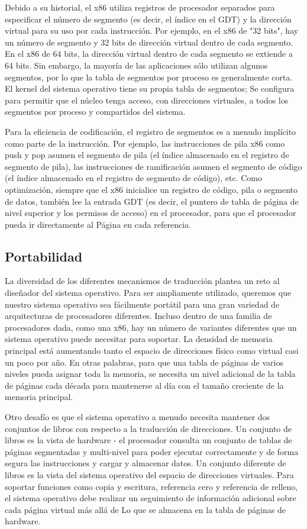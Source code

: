 \documentclass[10pt]{book}
\begin{document}
Debido a su historial, el x86 utiliza registros de procesador separados para especificar el número de segmento (es decir, el índice en el GDT) y la dirección virtual para su uso por cada instrucción. Por ejemplo, en el x86 de "32 bits", hay un número de segmento y 32 bits de dirección virtual dentro de cada segmento. En el x86 de 64 bits, la dirección virtual dentro de cada segmento se extiende a 64 bits. Sin embargo, la mayoría de las aplicaciones sólo utilizan algunos segmentos, por lo que la tabla de segmentos por proceso es generalmente corta. El kernel del sistema operativo tiene su propia tabla de segmentos; Se configura para permitir que el núcleo tenga acceso, con direcciones virtuales, a todos los segmentos por proceso y compartidos del sistema.

Para la eficiencia de codificación, el registro de segmentos es a menudo implícito como parte de la instrucción. Por ejemplo, las instrucciones de pila x86 como push y pop asumen el segmento de pila (el índice almacenado en el registro de segmento de pila), las instrucciones de ramificación asumen el segmento de código (el índice almacenado en el registro de segmento de código), etc. Como optimización, siempre que el x86 inicialice un registro de código, pila o segmento de datos, también lee la entrada GDT (es decir, el puntero de tabla de página de nivel superior y los permisos de acceso) en el procesador, para que el procesador pueda ir directamente al Página en cada referencia.


\subsection{Portabilidad}
La diversidad de los diferentes mecanismos de traducción plantea un reto al diseñador del sistema operativo. Para ser ampliamente utilizado, queremos que nuestro sistema operativo sea fácilmente portátil para una gran variedad de arquitecturas de procesadores diferentes. Incluso dentro de una familia de procesadores dada, como una x86, hay un número de variantes diferentes que un sistema operativo puede necesitar para soportar. La densidad de memoria principal está aumentando tanto el espacio de direcciones físico como virtual casi un poco por año. En otras palabras, para que una tabla de páginas de varios niveles pueda asignar toda la memoria, se necesita un nivel adicional de la tabla de páginas cada década para mantenerse al día con el tamaño creciente de la memoria principal.

Otro desafío es que el sistema operativo a menudo necesita mantener dos conjuntos de libros con respecto a la traducción de direcciones. Un conjunto de libros es la vista de hardware - el procesador consulta un conjunto de tablas de páginas segmentadas y multi-nivel para poder ejecutar correctamente y de forma segura las instrucciones y cargar y almacenar datos. Un conjunto diferente de libros es la vista del sistema operativo del espacio de direcciones virtuales. Para soportar funciones como copia y escritura, referencia cero y referencia de relleno, el sistema operativo debe realizar un seguimiento de información adicional sobre cada página virtual más allá de Lo que se almacena en la tabla de páginas de hardware.
\end{document}
